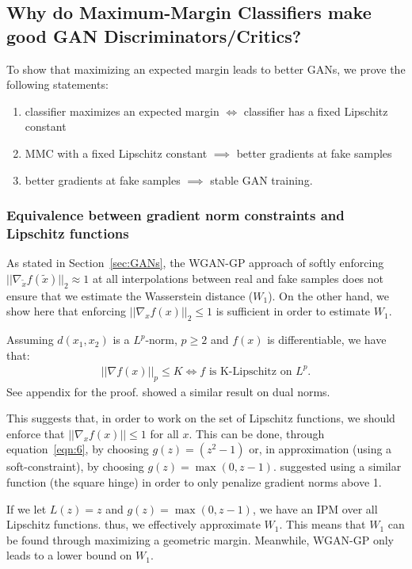 \documentclass{article}
\def\eqref#1{equation~\ref{#1}}
\begin{document}
\subsection{Why do Maximum-Margin Classifiers make good GAN Discriminators/Critics?}
\label{sec:5.3}

To show that maximizing an expected margin leads to better GANs, we prove the following statements:
\begin{enumerate}
    \item classifier maximizes an expected margin $\iff$ classifier has a fixed Lipschitz constant
    \item MMC with a fixed Lipschitz constant $\implies$ better gradients at fake samples
   \item better gradients at fake samples $\implies$ stable GAN training.
\end{enumerate}

\subsubsection{Equivalence between gradient norm constraints and Lipschitz functions}
\label{sec:5.2}

As stated in Section~\ref{sec:GANs}, the WGAN-GP approach of softly enforcing $|| \nabla_{\tilde{x}} f(\tilde{x}) ||_2 \approx 1$ at all interpolations between real and fake samples does not ensure that we estimate the Wasserstein distance ($W_1$).
On the other hand, we show here that enforcing $|| \nabla_x f(x) ||_2 \leq 1$ is sufficient in order to estimate $W_1$.

Assuming $d(x_1,x_2)$ is a $L^p$-norm, $p \ge 2$ and $f(x)$ is differentiable, we have that:
\begin{align*}
|| \nabla f(x) ||_p \leq K \iff f \text{ is K-Lipschitz on $L^p$}.
\end{align*} See appendix for the proof. \citet{adler2018banach} showed a similar result on dual norms. 

This suggests that, in order to work on the set of Lipschitz functions, we should enforce that $|| \nabla_x f(x) || \leq 1$ for all $x$.
This can be done, through \eqref{eqn:6}, by choosing $g(z)=(z^2-1)$ or, in approximation (using a soft-constraint), by choosing $g(z)=\max(0,z-1)$. \citet{petzka2017regularization} suggested using a similar function (the square hinge) in order to only penalize gradient norms above 1.

If we let $L(z)=z$ and $g(z)=\max(0,z-1)$, we have an IPM over all Lipschitz functions. thus, we effectively approximate $W_1$. This means that $W_1$ can be found through maximizing a geometric margin. Meanwhile, WGAN-GP only leads to a lower bound on $W_1$.
\end{document}
